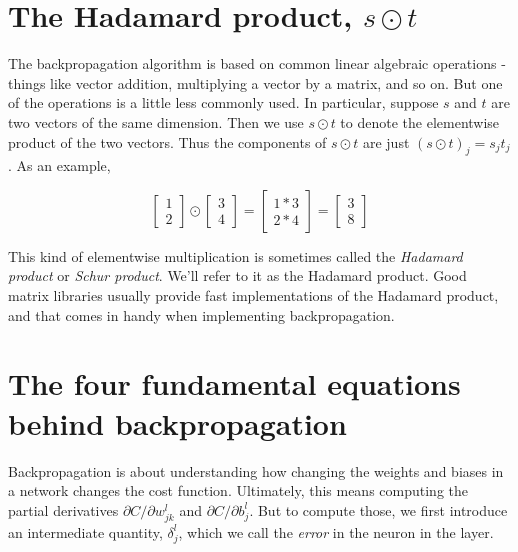 \section{The Hadamard product, $s\odot t$}

The backpropagation algorithm is based on common linear algebraic operations - things like vector addition, multiplying a vector by a matrix, and so on. But one of the operations is a little less commonly used. In particular, suppose $s$
and $t$ are two vectors of the same dimension. Then we use $s\odot t$ to denote the elementwise product of the two vectors. Thus the components of $s\odot t$ are just $(s \odot t)_{j}=s_{j} t_{j}$. As an example, 

\begin{equation}
\left[ \begin{array}{l}{1} \\ {2}\end{array}\right] \odot \left[ \begin{array}{l}{3} \\ {4}\end{array}\right]=\left[ \begin{array}{l}{1 * 3} \\ {2 * 4}\end{array}\right]=\left[ \begin{array}{l}{3} \\ {8}\end{array}\right]
\label{eq:c02-28}
\end{equation}

This kind of elementwise multiplication is sometimes called the \textit{Hadamard product} or \textit{Schur product}. We'll refer to it as the Hadamard product. Good matrix libraries usually provide fast implementations of the Hadamard product, and that comes in handy when implementing backpropagation.


\section{The four fundamental equations behind backpropagation}

Backpropagation is about understanding how changing the weights and biases in a network changes the cost function. Ultimately, this means computing the partial derivatives $\partial C / \partial w_{j k}^{l}$ and $\partial C / \partial b_{j}^{l}$. But to compute those, we first introduce an intermediate quantity, $\delta_{j}^{l}$, which we call the \textit{error} in the  neuron in the  layer. 


